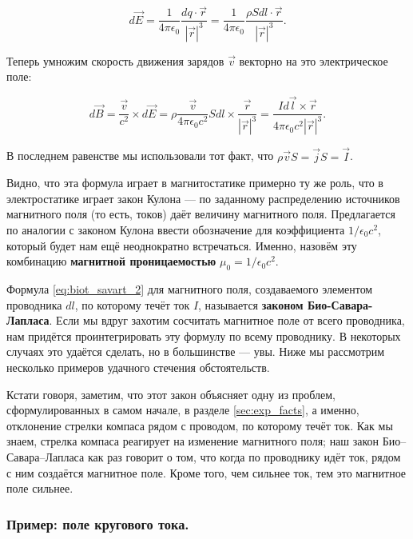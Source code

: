 \documentclass[a4paper,12pt]{article}
\numberwithin{equation}{section}
\newcommand{\eps}{\epsilon}
\begin{document}
\begin{equation}
  \label{eq:biot_savart_1}
  d\vec{E} = \frac{1}{4\pi\eps_0} \frac{dq \cdot \vec{r}}{|\vec{r}|^3}
  = \frac{1}{4\pi\eps_0} \frac{\rho S dl
    \cdot \vec{r}}{|\vec{r}|^3}.
\end{equation}

Теперь умножим скорость движения зарядов $\vec{v}$ векторно на это
электрическое поле: 

\begin{equation}
  \label{eq:biot_savart_2}
  d\vec{B} = \frac{\vec{v}}{c^2}  \times d\vec{E} = \rho \frac{\vec{v}}{4\pi\eps_0c^2} S dl \times
  \frac{\vec{r}}{|\vec{r}|^3} = \frac{I d\vec{l} \times \vec{r}}{4\pi\eps_0c^2|\vec{r}|^3}.
\end{equation}

В последнем равенстве мы использовали тот факт, что $\rho \vec{v} S =
\vec{j} S = \vec{I}$. 

Видно, что эта формула играет в магнитостатике примерно ту же роль,
что в электростатике играет закон Кулона --- по заданному
распределению источников магнитного поля (то есть, токов) даёт
величину магнитного поля. Предлагается по аналогии с законом Кулона
ввести обозначение для коэффициента $1/\eps_0c^2$, который будет нам
ещё неоднократно встречаться. Именно, назовём эту комбинацию
\textbf{магнитной проницаемостью} $\mu_0 = 1/\eps_0c^2$. 


Формула \eqref{eq:biot_savart_2} для магнитного поля, создаваемого
элементом проводника $dl$, по которому течёт ток $I$, называется
\textbf{законом Био-Савара-Лапласа}. Если мы вдруг захотим сосчитать
магнитное поле от всего проводника, нам придётся проинтегрировать эту
формулу по всему проводнику. В некоторых случаях это удаётся сделать,
но в большинстве — увы. Ниже мы рассмотрим несколько примеров удачного
стечения обстоятельств. 

Кстати говоря, заметим, что этот закон объясняет одну из проблем,
сформулированных в самом начале, в разделе \ref{sec:exp_facts}, а
именно, отклонение стрелки компаса рядом с проводом, по которому течёт
ток. Как мы знаем, стрелка компаса реагирует на изменение магнитного
поля; наш закон Био--Савара--Лапласа как раз говорит о том, что когда
по проводнику идёт ток, рядом с ним создаётся магнитное поле. Кроме
того, чем сильнее ток, тем это магнитное поле сильнее. 

\subsubsection{Пример: поле кругового тока.}
\label{sec:ex_current_circle}
\end{document}
